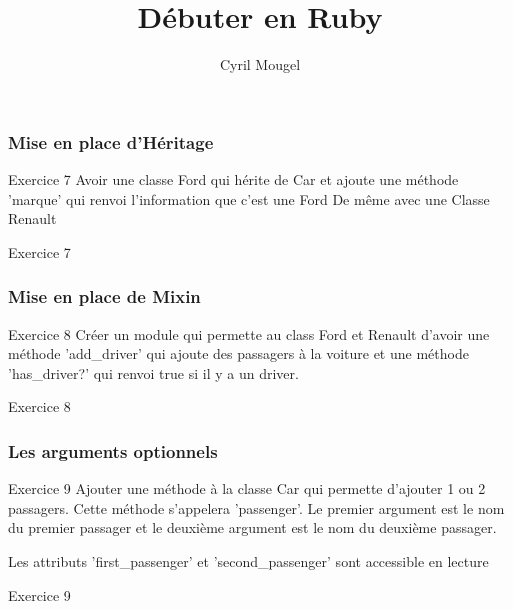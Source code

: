 \documentclass{beamer}
\title{D\'ebuter en Ruby}
\author{Cyril Mougel}
\begin{document}
\begin{frame}
  \titlepage
\end{frame}

\begin{frame}
  \frametitle{Mise en place d'H\'eritage}
  \begin{block}{Exercice 7}
  Avoir une classe Ford qui h\'erite de Car et ajoute une m\'ethode 'marque' qui renvoi l'information que c'est une Ford
  De même avec une Classe Renault
\end{block}
\end{frame}

\begin{frame}
  \begin{beamerboxesrounded}{Exercice 7}
    
  \end{beamerboxesrounded}
\end{frame}

\begin{frame}
  \frametitle{Mise en place de Mixin}
  \begin{block}{Exercice 8}
  Cr\'eer un module qui permette au class Ford et Renault d'avoir une m\'ethode 'add\_driver'
  qui ajoute des passagers à la voiture et une m\'ethode 'has\_driver?' qui renvoi true si il y a un driver.
\end{block}
\end{frame}
\begin{frame}
  \begin{beamerboxesrounded}{Exercice 8}
    
  \end{beamerboxesrounded}
\end{frame}

\begin{frame}
  \frametitle{Les arguments optionnels}
  \begin{block}{Exercice 9}
  Ajouter une m\'ethode à la classe Car qui permette d'ajouter 1 ou 2 passagers. Cette m\'ethode s'appelera 'passenger'. Le premier argument est le nom du premier passager et le deuxième argument est le nom du deuxième passager.

  Les attributs 'first\_passenger' et 'second\_passenger' sont accessible en lecture
\end{block}
\end{frame}

\begin{frame}
  \begin{beamerboxesrounded}{Exercice 9}
    
  \end{beamerboxesrounded}
\end{frame}
\end{document}
